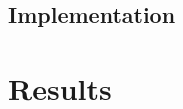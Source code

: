 

\subsection*{Implementation}\label{ssec:implementation}

%



\section*{Results}\label{sec:results}



